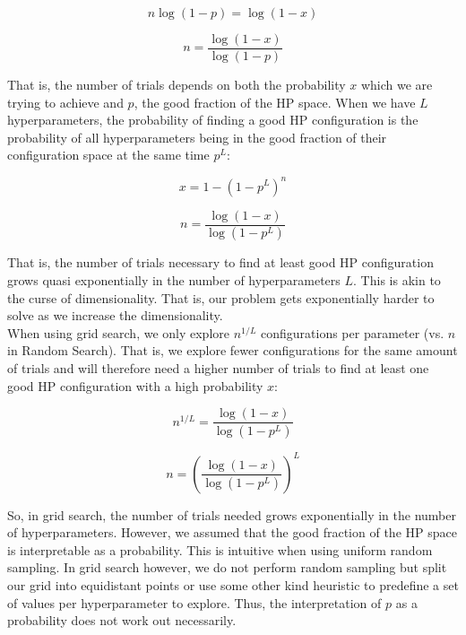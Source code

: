 \documentclass[11pt]{article}
\begin{document}
\begin{equation}
	n\log(1-p) = \log(1-x)
\end{equation}

\begin{equation}
	n = \frac{\log(1-x)}{\log(1-p)}  
\end{equation}

\noindent That is, the number of trials depends on both the probability $x$ which we are trying to achieve and $p$, the good fraction of the HP space. When we have $L$ hyperparameters, the probability of finding a good HP configuration is the probability of all hyperparameters being in the good fraction of their configuration space at the same time $p^L$: 

\begin{equation}
	x = 1-(1-p^L)^n
\end{equation}

\begin{equation}
	n = \frac{\log(1-x)}{\log(1-p^L)}  
\end{equation}


\noindent That is, the number of trials necessary to find at least good HP configuration grows quasi exponentially in the number of hyperparameters $L$. This is akin to the curse of dimensionality. That is, our problem gets exponentially harder to solve as we increase the dimensionality.\\


\noindent When using grid search, we only explore $n^{1/L}$ configurations per parameter (vs. $n$ in Random Search). That is, we explore fewer configurations for the same amount of trials and will therefore need a higher number of trials to find at least one good HP configuration with a high probability $x$:

\begin{equation}
  n^{1/L}=\frac{\log(1-x)}{\log(1-p^L)}
\end{equation}

\begin{equation}
  n=\left(\frac{\log(1-x)}{\log(1-p^L)}\right)^L
\end{equation}

\noindent So, in grid search, the number of trials needed grows exponentially in the number of hyperparameters. However, we assumed that the good fraction of the HP space is interpretable as a probability. This is intuitive when using uniform random sampling. In grid search however, we do not perform random sampling but split our grid into equidistant points or use some other kind heuristic to predefine a set of values per hyperparameter to explore. Thus, the interpretation of $p$ as a probability does not work out necessarily.
\end{document}
